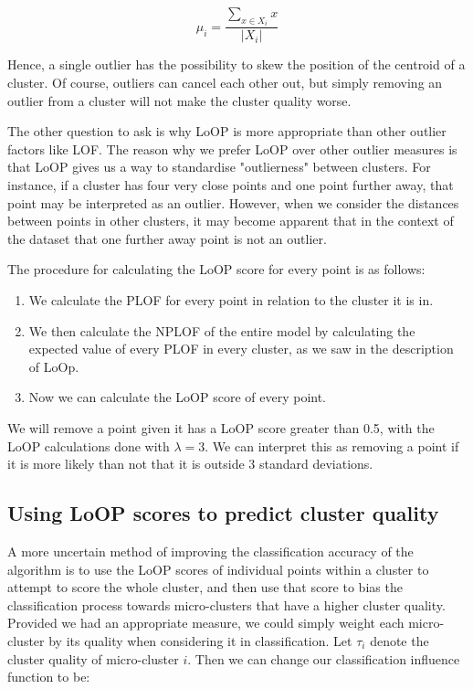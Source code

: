\documentclass[12pt,a4paper,oneside]{report}
\begin{document}
\[\mu_i = \frac{\sum_{x \in X_i}x}{|X_i|}\]

Hence, a single outlier has the possibility to skew the position of the centroid of a cluster. Of course, outliers can cancel each other out, but simply removing an outlier from a cluster will not make the cluster quality worse. 

The other question to ask is why LoOP is more appropriate than other outlier factors like LOF\cite{LOF}. The reason why we prefer LoOP over other outlier measures is that LoOP gives us a way to standardise "outlierness" between clusters. For instance, if a cluster has four very close points and one point further away, that point may be interpreted as an outlier. However, when we consider the distances between points in other clusters, it may become apparent that in the context of the dataset that one further away point is not an outlier. 

The procedure for calculating the LoOP score for every point is as follows:

\begin{enumerate}
\item We calculate the PLOF for every point in relation to the cluster it is in. 
\item We then calculate the NPLOF of the entire model by calculating the expected value of every PLOF in every cluster, as we saw in the description of LoOp. 
\item Now we can calculate the LoOP score of every point. 
\end{enumerate}

We will remove a point given it has a LoOP score greater than 0.5, with the LoOP calculations done with $\lambda = 3$. We can interpret this as removing a point if it is more likely than not that it is outside 3 standard deviations. 

\subsection*{Using LoOP scores to predict cluster quality}

A more uncertain method of improving the classification accuracy of the algorithm is to use the LoOP scores of individual points within a cluster to attempt to score the whole cluster, and then use that score to bias the classification process towards micro-clusters that have a higher cluster quality. Provided we had an appropriate measure, we could simply weight each micro-cluster by its quality when considering it in classification. Let $\tau_i$ denote the cluster quality of micro-cluster $i$. Then we can change our classification influence function to be:
\end{document}
